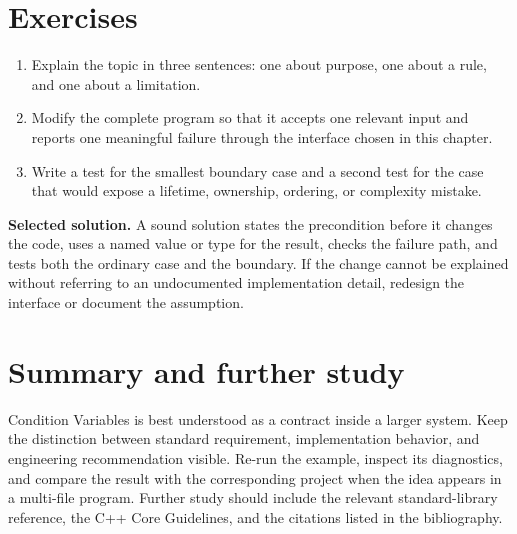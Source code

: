 \section{Exercises}
\begin{enumerate}
  \item Explain the topic in three sentences: one about purpose, one about a rule, and one about a limitation.
  \item Modify the complete program so that it accepts one relevant input and reports one meaningful failure through the interface chosen in this chapter.
  \item Write a test for the smallest boundary case and a second test for the case that would expose a lifetime, ownership, ordering, or complexity mistake.
\end{enumerate}

\textbf{Selected solution.} A sound solution states the precondition before it changes the code, uses a named value or type for the result, checks the failure path, and tests both the ordinary case and the boundary. If the change cannot be explained without referring to an undocumented implementation detail, redesign the interface or document the assumption.

\section{Summary and further study}
Condition Variables is best understood as a contract inside a larger system. Keep the distinction between standard requirement, implementation behavior, and engineering recommendation visible. Re-run the example, inspect its diagnostics, and compare the result with the corresponding project when the idea appears in a multi-file program. Further study should include the relevant standard-library reference, the C++ Core Guidelines, and the citations listed in the bibliography.

